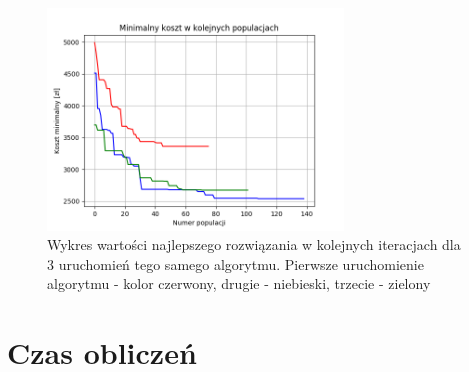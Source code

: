 \documentclass[12pt, oneside, final]{report}
\begin{document}
\begin{figure}[ht!]
\centering
\includegraphics[width=0.7\textwidth]{graphics/diff-population}
\caption{Wykres wartości najlepszego rozwiązania w kolejnych iteracjach dla 3 uruchomień tego samego algorytmu. Pierwsze uruchomienie algorytmu - kolor czerwony, drugie - niebieski, trzecie - zielony}
\label{fig:diff-population}
\end{figure}

\section{Czas obliczeń}
 
\end{document}
